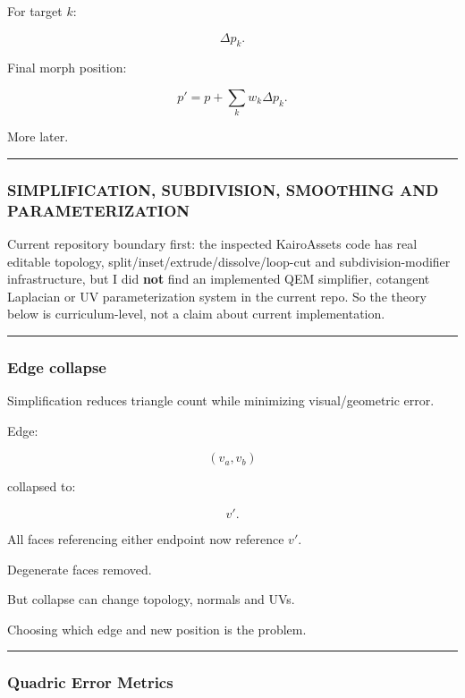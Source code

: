 For target \(k\):

\[
\Delta p_k.
\]

Final morph position:

\[
p'=p+\sum_k w_k\Delta p_k.
\]

More later.

\begin{center}\rule{0.5\linewidth}{0.5pt}\end{center}

\subsubsection{SIMPLIFICATION, SUBDIVISION, SMOOTHING AND PARAMETERIZATION}\label{simplification-subdivision-smoothing-and-parameterization}

Current repository boundary first: the inspected KairoAssets code has real editable topology, split/inset/extrude/dissolve/loop-cut and subdivision-modifier infrastructure, but I did \textbf{not} find an implemented QEM simplifier, cotangent Laplacian or UV parameterization system in the current repo. So the theory below is curriculum-level, not a claim about current implementation.

\begin{center}\rule{0.5\linewidth}{0.5pt}\end{center}

\subsubsection{Edge collapse}\label{edge-collapse}

Simplification reduces triangle count while minimizing visual/geometric error.

Edge:

\[
(v_a,v_b)
\]

collapsed to:

\[
v'.
\]

All faces referencing either endpoint now reference \(v'\).

Degenerate faces removed.

But collapse can change topology, normals and UVs.

Choosing which edge and new position is the problem.

\begin{center}\rule{0.5\linewidth}{0.5pt}\end{center}

\subsubsection{Quadric Error Metrics}\label{quadric-error-metrics}

